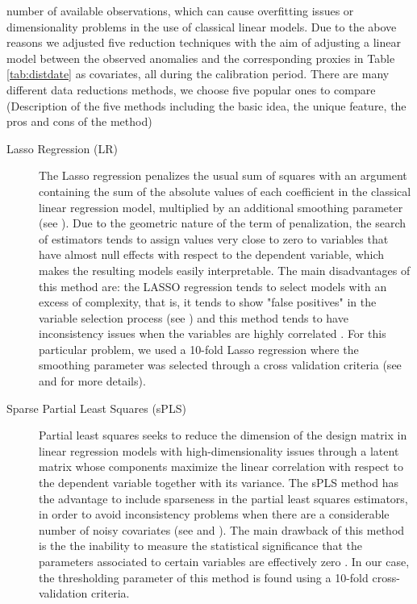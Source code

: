 \documentclass[11pt]{amsart}
\theoremstyle{plain}
\theoremstyle{definition}
\theoremstyle{remark}
\begin{document}
number of available observations, which can cause overfitting issues or
dimensionality problems in the use of classical linear models. Due to the above
reasons we adjusted five reduction techniques with the aim of adjusting
a linear model between the observed anomalies and the corresponding proxies in
Table \ref{tab:distdate} as covariates, all during the calibration
period. There are many different data reductions methods, we choose five popular ones to compare (Description of the five methods including the basic idea, the unique feature, the pros and cons of the method)
\begin{description}
\item[Lasso Regression (LR)]
  The Lasso regression penalizes the usual sum of squares with an argument
 containing the sum of the absolute values of each coefficient in the classical
 linear regression model, multiplied by an additional smoothing parameter (see \cite{Tibshirani1996}). Due
 to the geometric nature of the term of penalization, the search of estimators
 tends to assign values very close to zero to variables that have almost null
 effects with respect to the dependent variable, which makes the resulting
 models easily interpretable. The main disadvantages of this method are: the
 LASSO regression tends to select models with an excess of complexity, that is,
 it tends to show "false positives" in the variable selection process (see
 \cite{Fan2010}) and this method tends to have inconsistency issues when the
 variables are highly correlated \cite{Zou2005}. For this particular problem, we used a 10-fold Lasso regression where the smoothing parameter was selected
through a cross validation criteria (see \cite{Tibshirani1996} and \cite{Friedman2010} for more details). 
\item[Sparse Partial Least Squares (sPLS)] 
  Partial least squares seeks to reduce the dimension of the design matrix in
  linear regression models with high-dimensionality issues through a latent matrix
  whose components maximize the linear correlation with respect to the
  dependent variable together with its variance. The sPLS method has the advantage to include sparseness in the partial least squares
  estimators, in order to avoid inconsistency problems when there are a
  considerable number of noisy covariates (see \cite{Chun2010} and
  \cite{Chung2013}). The main drawback of this method is the the inability to
  measure the statistical significance that the parameters associated to certain
  variables are effectively zero \cite{OlsonHunt2014}. In our case, the
  thresholding parameter of this method is found using a 10-fold cross-validation criteria.    

\end{description}
\end{document}
